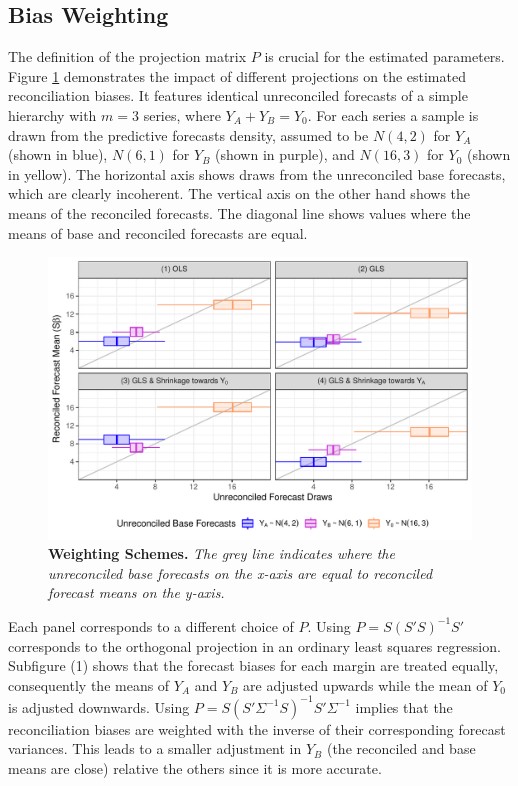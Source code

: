 \documentclass[a4paper,fleqn,11pt]{article}
\begin{document}
\subsection{Bias Weighting}
\label{sec:weighting}
The definition of the projection matrix $P$ is crucial for the estimated parameters. Figure \ref{fig:weights} demonstrates the impact of different projections on the estimated reconciliation biases. It features identical unreconciled forecasts of a simple hierarchy with $m=3$ series, where $Y_A + Y_B = Y_0$. For each series a sample is drawn from the predictive forecasts density, assumed to be $N(4,2)$ for $Y_A$ (shown in blue), $N(6,1)$ for $Y_B$ (shown in purple), and $N(16,3)$ for $Y_0$ (shown in yellow). The horizontal axis shows draws from the unreconciled base forecasts, which are clearly incoherent. The vertical axis on the other hand shows the means of the reconciled forecasts. The diagonal line shows values where the means of base and reconciled forecasts are equal.
\begin{figure}[H]
	\includegraphics[width=\textwidth]{fig/fig_biases}
	\caption[Weighting Schemes]{\textbf{Weighting Schemes.} \small{\textit{The grey line indicates where the unreconciled base forecasts on the x-axis are equal to reconciled forecast means on the y-axis.}}}\label{fig:weights}
\end{figure}
Each panel corresponds to a different choice of $P$. Using $P = S(S'S)^{-1}S'$ corresponds to the orthogonal projection in an ordinary least squares regression. Subfigure (1) shows that the forecast biases for each margin are treated equally, consequently the means of $Y_A$ and $Y_B$ are adjusted upwards while the mean of $Y_0$ is adjusted downwards. Using $P = S(S'\Sigma^{-1}S)^{-1}S'\Sigma^{-1}$ implies that the reconciliation biases are weighted with the inverse of their corresponding forecast variances. This leads to a smaller adjustment in $Y_B$ (the reconciled and base means are close) relative the others since it is more accurate.\\
\end{document}
